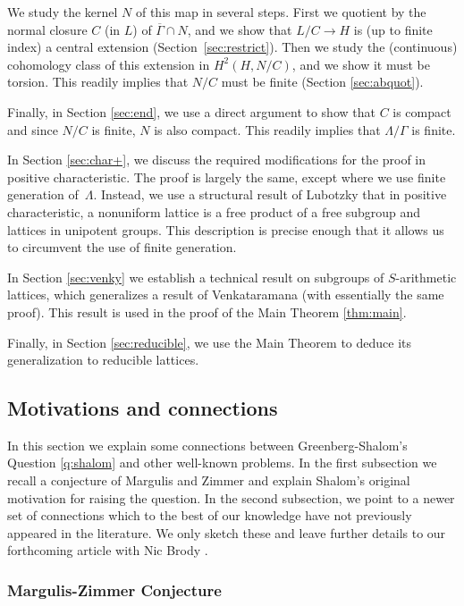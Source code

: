 \documentclass[11pt]{article}
\numberwithin{equation}{section}\providecommand{\llangle}{\langle\!\langle}\providecommand{\rrangle}{\rangle\!\rangle}\providecommand{\Asterisk}{\ast}
\theoremstyle{definition}
\begin{document}
We study the kernel $N$ of this map in several steps. First we quotient by the normal closure $C$ (in $L$) of $\overline{\Gamma}\cap N$, and we show that $L/C\to H$ is (up to finite index) a central extension (Section~\ref{sec:restrict}). Then we study the (continuous) cohomology class of this extension in $H^2(H,N/C)$, and we show it must be torsion. This readily implies that $N/C$ must be finite (Section \ref{sec:abquot}).

Finally, in Section \ref{sec:end}, we use a direct argument to show that $C$ is compact and since $N/C$ is finite, $N$ is also compact. This readily implies that $\Lambda/\Gamma$ is finite.

In Section \ref{sec:char+}, we discuss the required modifications for the proof in positive characteristic. The proof is largely the same, except where we use finite generation of~$\Lambda$. \hbox{Instead}, we use a structural result of Lubotzky that in positive characteristic, a nonuniform lattice is a free product of a free subgroup and lattices in unipotent groups. This description is precise enough that it allows us to circumvent the use of finite generation.

In Section \ref{sec:venky} we establish a technical result on subgroups of $S$-arithmetic lattices, which generalizes a result of Venkataramana (with essentially the same proof). This result is used in the proof of the Main Theorem \ref{thm:main}.

Finally, in Section \ref{sec:reducible}, we use the Main Theorem to deduce its generalization to reducible lattices.

\subsection{Motivations and connections}
\label{sec:connect}

In this section we explain some connections between Greenberg-Shalom's Question \ref{q:shalom} and other well-known problems. In the first subsection we recall a conjecture of Margulis and Zimmer and explain Shalom's original motivation for raising the question. In the second subsection, we point to a newer set of connections which to the best of our knowledge have not previously appeared in the literature. We only sketch these and leave further details to our forthcoming article with Nic Brody \cite{BFMVL}.

\subsubsection{Margulis-Zimmer Conjecture}
\label{subsec:mz}
\end{document}
